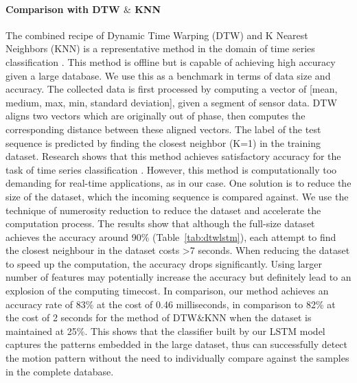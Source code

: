 \documentclass[review]{vgtc}                 %
\begin{document}
\paragraph{Comparison with DTW $\&$ KNN}The combined recipe of Dynamic Time Warping (DTW) and  K Nearest Neighbors (KNN) is a representative method in the domain of time series classification \cite{mitsa2010temporal}.
This method is offline but is capable of achieving high accuracy given a large database.
We use this as a benchmark in terms of data size and accuracy.
The collected data is first processed by computing a vector of [mean, medium, max, min, standard deviation], given a segment of sensor data.
DTW aligns two vectors which are originally out of phase, then computes the corresponding distance between these aligned vectors. 
The label of the test sequence is predicted by finding the closest neighbor (K=1) in the training dataset. 
Research shows that this method achieves satisfactory accuracy for the task of time series classification \cite{xi2006fast}. 
However, this method is computationally too demanding for real-time applications, as in our case. 
One solution is to reduce the size of the dataset, which the incoming sequence is compared against. 
We use the technique of numerosity reduction \cite{xi2006fast, mitsa2010temporal} to reduce the dataset and accelerate the computation process. 
The results show that although the full-size dataset achieves the accuracy around 90\% (Table~\ref{tab:dtwlstm}), each attempt to find the closest neighbour in the dataset costs >7 seconds.
When reducing the dataset to speed up the computation, the accuracy drops significantly. 
Using larger number of features may potentially increase the accuracy but definitely lead to an explosion of the computing timecost.
In comparison, our method achieves an accuracy rate of 83\% at the cost of 0.46 milliseconds, in comparison to 82\% at the cost of 2 seconds for the method of DTW\&KNN when the dataset is maintained at 25\%.
This shows that the classifier built by our LSTM model captures the patterns embedded in the large dataset, thus can successfully detect the motion pattern without the need to individually compare against the samples in the complete database.
\end{document}
